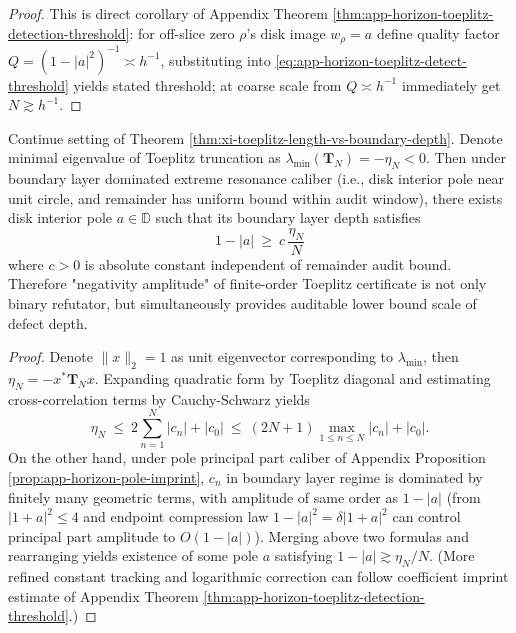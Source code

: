 \begin{proof}
This is direct corollary of Appendix Theorem \ref{thm:app-horizon-toeplitz-detection-threshold}: for off-slice zero \(\rho\)'s disk image \(w_\rho=a\) define quality factor \(Q=(1-|a|^2)^{-1}\asymp h^{-1}\), substituting into \eqref{eq:app-horizon-toeplitz-detect-threshold} yields stated threshold; at coarse scale from \(Q\asymp h^{-1}\) immediately get \(N\gtrsim h^{-1}\).
\end{proof}

\begin{proposition}\label{prop:xi-toeplitz-min-eig-controls-depth}
Continue setting of Theorem \ref{thm:xi-toeplitz-length-vs-boundary-depth}.
Denote minimal eigenvalue of Toeplitz truncation as \(\lambda_{\min}(\mathbf{T}_N)=-\eta_N<0\).
Then under boundary layer dominated extreme resonance caliber (i.e., disk interior pole near unit circle, and remainder has uniform bound within audit window), there exists disk interior pole \(a\in\mathbb{D}\) such that its boundary layer depth satisfies
\[
\boxed{\;
1-|a|\ \ge\ c\,\frac{\eta_N}{N}\;}
\]
where \(c>0\) is absolute constant independent of remainder audit bound.
Therefore "negativity amplitude" of finite-order Toeplitz certificate is not only binary refutator, but simultaneously provides auditable lower bound scale of defect depth.
\end{proposition}

\begin{proof}
Denote \(\|x\|_2=1\) as unit eigenvector corresponding to \(\lambda_{\min}\), then
\(
\eta_N=-x^\ast\mathbf{T}_N x
\).
Expanding quadratic form by Toeplitz diagonal and estimating cross-correlation terms by Cauchy-Schwarz yields
\[
\eta_N\ \le\ 2\sum_{n=1}^{N}|c_n|+|c_0|
\ \le\ (2N+1)\max_{1\le n\le N}|c_n|+|c_0|.
\]
On the other hand, under pole principal part caliber of Appendix Proposition \ref{prop:app-horizon-pole-imprint}, \(c_n\) in boundary layer regime is dominated by finitely many geometric terms, with amplitude of same order as \(1-|a|\) (from \(|1+a|^2\le 4\) and endpoint compression law \(1-|a|^2=\delta|1+a|^2\) can control principal part amplitude to \(O(1-|a|)\)).
Merging above two formulas and rearranging yields existence of some pole \(a\) satisfying \(1-|a|\gtrsim \eta_N/N\).
(More refined constant tracking and logarithmic correction can follow coefficient imprint estimate of Appendix Theorem \ref{thm:app-horizon-toeplitz-detection-threshold}.)
\end{proof}

